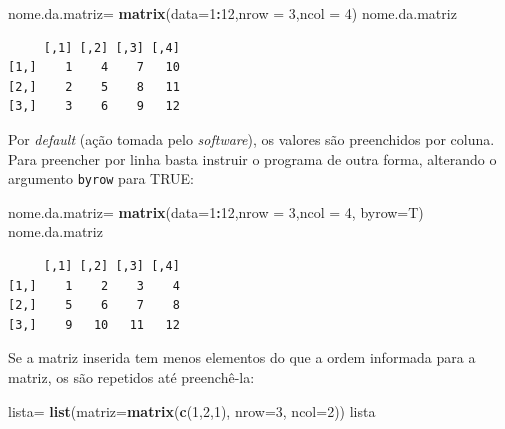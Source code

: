 \documentclass[12pt,brazil,oneside]{book}
\newenvironment{Shaded}{\begin{snugshade}}{\end{snugshade}}
\newcommand{\DataTypeTok}[1]{\textcolor[rgb]{0.13,0.29,0.53}{#1}}
\newcommand{\DecValTok}[1]{\textcolor[rgb]{0.00,0.00,0.81}{#1}}
\newcommand{\KeywordTok}[1]{\textcolor[rgb]{0.13,0.29,0.53}{\textbf{#1}}}
\newcommand{\NormalTok}[1]{#1}
\newcommand{\OperatorTok}[1]{\textcolor[rgb]{0.81,0.36,0.00}{\textbf{#1}}}
\newcommand{\StringTok}[1]{\textcolor[rgb]{0.31,0.60,0.02}{#1}}
\begin{document}
\begin{Shaded}
\begin{Highlighting}[]
\NormalTok{nome.da.matriz=}\StringTok{ }\KeywordTok{matrix}\NormalTok{(}\DataTypeTok{data=}\DecValTok{1}\OperatorTok{:}\DecValTok{12}\NormalTok{,}\DataTypeTok{nrow =} \DecValTok{3}\NormalTok{,}\DataTypeTok{ncol =} \DecValTok{4}\NormalTok{)}
\NormalTok{nome.da.matriz}
\end{Highlighting}
\end{Shaded}

\begin{verbatim}
     [,1] [,2] [,3] [,4]
[1,]    1    4    7   10
[2,]    2    5    8   11
[3,]    3    6    9   12
\end{verbatim}

Por \emph{default} (ação tomada pelo \emph{software}), os valores são preenchidos por coluna. Para preencher por linha basta instruir o programa de outra forma, alterando o argumento \texttt{byrow} para TRUE:

\begin{Shaded}
\begin{Highlighting}[]
\NormalTok{nome.da.matriz=}\StringTok{ }\KeywordTok{matrix}\NormalTok{(}\DataTypeTok{data=}\DecValTok{1}\OperatorTok{:}\DecValTok{12}\NormalTok{,}\DataTypeTok{nrow =} \DecValTok{3}\NormalTok{,}\DataTypeTok{ncol =} \DecValTok{4}\NormalTok{, }\DataTypeTok{byrow=}\NormalTok{T)}
\NormalTok{nome.da.matriz}
\end{Highlighting}
\end{Shaded}

\begin{verbatim}
     [,1] [,2] [,3] [,4]
[1,]    1    2    3    4
[2,]    5    6    7    8
[3,]    9   10   11   12
\end{verbatim}

Se a matriz inserida tem menos elementos do que a ordem informada para a matriz, os são repetidos até preenchê-la:

\begin{Shaded}
\begin{Highlighting}[]
\NormalTok{lista=}\StringTok{ }\KeywordTok{list}\NormalTok{(}\DataTypeTok{matriz=}\KeywordTok{matrix}\NormalTok{(}\KeywordTok{c}\NormalTok{(}\DecValTok{1}\NormalTok{,}\DecValTok{2}\NormalTok{,}\DecValTok{1}\NormalTok{), }\DataTypeTok{nrow=}\DecValTok{3}\NormalTok{, }\DataTypeTok{ncol=}\DecValTok{2}\NormalTok{))}
\NormalTok{lista}
\end{Highlighting}
\end{Shaded}
\end{document}
